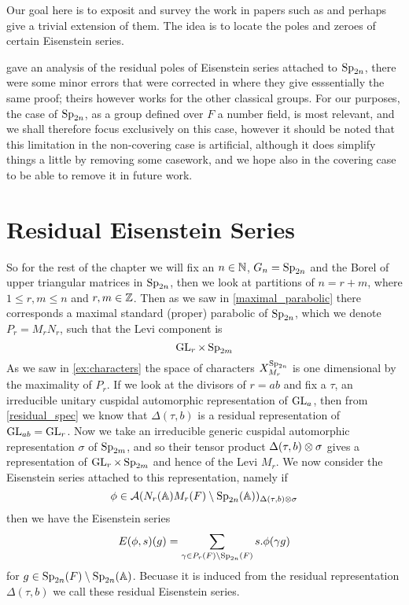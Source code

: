 Our goal here is to exposit and survey the work in papers such as \cite{brennerNotesAnalyticProperties2009}\cite{jiangPolesCertainResidual2013}\cite{ginzburgTopFourierCoefficients2021} and perhaps give a trivial extension of them. The idea is to locate the poles and zeroes of certain Eisenstein series. 

\cite{brennerNotesAnalyticProperties2009} gave an analysis of the residual poles of Eisenstein series attached to \(\operatorname{Sp}_{2n}\), there were some minor errors that were corrected in \cite{jiangPolesCertainResidual2013} where they give esssentially the same proof; theirs however works for the other classical groups. For our purposes, the case of \(\operatorname{Sp}_{2n}\), as a group defined over \(F\) a number field, is most relevant, and we shall therefore focus exclusively on this case, however it should be noted that this limitation in the non-covering case is artificial, although it does simplify things a little by removing some casework, and we hope also in the covering case to be able to remove it in future work. 

\section{Residual Eisenstein Series}
So for the rest of the chapter we will fix an \(n\in \N\), \(G_n = \operatorname{Sp}_{2n}\) and the Borel of upper triangular matrices in \(\operatorname{Sp}_{2n} \), then we look at partitions of \(n = r + m\), where \(1\leq r,m \leq n\) and \(r,m\in \Z\). Then as we saw in \ref{maximal_parabolic} there corresponds a maximal standard (proper) parabolic of \(\operatorname{Sp}_{2n}\), which we denote \(P_r = M_rN_r\), such that the Levi component is 
\[\operatorname{GL}_r\times \operatorname{Sp}_{2m} \]
As we saw in \ref{ex:characters} the space of characters \(X^{\operatorname{Sp}_{2n}}_{M_r}\) is one dimensional by the maximality of \(P_r\). If we look at the divisors of \(r = ab\)
 and fix a \(\tau\), an irreducible unitary cuspidal automorphic representation of \(\operatorname{GL}_a\), then from \ref{residual_spec} we know that \(\Delta(\tau, b)\) is a residual representation of \(\operatorname{GL}_{ab} = \operatorname{GL}_r\). Now we take an irreducible generic cuspidal automorphic representation \(\sigma\) of \(\operatorname{Sp}_{2m}\), and so their tensor product \(\Delta(\tau, b) \otimes \sigma\) gives a representation of \(\operatorname{GL}_{r}\times \operatorname{Sp}_{2m}\) and hence of the Levi \(M_r\). We now consider the Eisenstein series attached to this representation, namely if 
\[\phi\in \mathcal{A}(N_r(\A)M_r(F)\setminus \Sp_{2n}(\A) )_{\Delta(\tau, b)\tensor \sigma}\] 
then we have the Eisenstein series
\[E(\phi, s)(g) = \sum_{\gamma\in P_r(F) \setminus \Sp_{2n}(F)} s.\phi(\gamma g)\]
for \(g\in \Sp_{2n}(F) \setminus \Sp_{2n}(\A)\). Becuase it is induced from the residual representation \(\Delta(\tau, b)\) we call these residual Eisenstein series.

